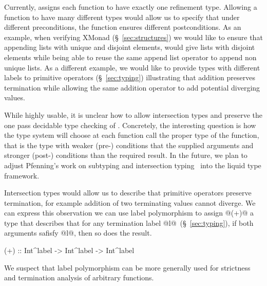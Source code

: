 Currently, \toolname assigns each function to have exactly one refinement type. 
Allowing a function to have many different types would allow us to specify 
that under different preconditions, the function ensures different postconditions. 
%
As an example, 
when verifying XMonad (\S~\ref{sec:structures})
we would like to ensure that appending lists with unique and disjoint elements, 
would give lists with disjoint elements
while being able to reuse the same append list operator to append non unique lists. 
%
As a different example, we would like to provide types 
with different labels 
to primitive operators (\S~\ref{sec:typing})
illustrating that addition preserves termination while 
allowing the same addition operator to add potential diverging values. 
%

While highly usable, it is unclear how to allow intersection types 
and preserve the one pass decidable type checking of \toolname.
% 
Concretely, the interesting question is how the type system will choose 
at each function call the proper type of the function, that is the type 
with weaker (pre-) conditions that the supplied arguments 
and stronger (post-) conditions than the required result. 
In the future, we plan to adjust Pfenning's work 
on subtyping and intersection typing~\citep{intersectiontypes,pfenning08,}
into the liquid type framework.


Intersection types would allow us to describe that primitive operators
preserve termination, for example addition of two terminating values cannot diverge. 
%
We can express this observation we can use label polymorphism
to assign @(+)@ a type that describes that for any termination label @l@~(\S~\ref{sec:typing}), 
if both arguments safisfy @l@, then so does the result.
\begin{code}
  (+) :: Int^label -> Int^label -> Int^label 
\end{code}
%
We suspect that label polymorphism can be more generally used for 
strictness and termination analysis of arbitrary functions.


